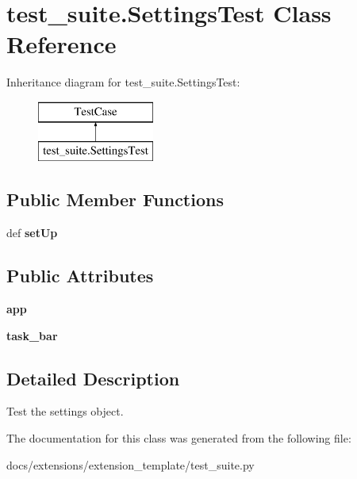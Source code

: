 \hypertarget{classtest__suite_1_1SettingsTest}{\section{test\-\_\-suite.\-Settings\-Test Class Reference}
\label{classtest__suite_1_1SettingsTest}
}
Inheritance diagram for test\-\_\-suite.\-Settings\-Test\-:\begin{figure}[H]
\begin{center}
\leavevmode
\includegraphics[height=2.000000cm]{classtest__suite_1_1SettingsTest}
\end{center}
\end{figure}
\subsection*{Public Member Functions}
\begin{DoxyCompactItemize}
\item 
\hypertarget{classtest__suite_1_1SettingsTest_aeaf8c43fc51455f8d8ab9d08dfc83fc2}{def {\bfseries set\-Up}}\label{classtest__suite_1_1SettingsTest_aeaf8c43fc51455f8d8ab9d08dfc83fc2}

\end{DoxyCompactItemize}
\subsection*{Public Attributes}
\begin{DoxyCompactItemize}
\item 
\hypertarget{classtest__suite_1_1SettingsTest_aa5ba18125ff41b7c4e906a92da7e47a0}{{\bfseries app}}\label{classtest__suite_1_1SettingsTest_aa5ba18125ff41b7c4e906a92da7e47a0}

\item 
\hypertarget{classtest__suite_1_1SettingsTest_acb4e8a196242a0a395d7777529de431c}{{\bfseries task\-\_\-bar}}\label{classtest__suite_1_1SettingsTest_acb4e8a196242a0a395d7777529de431c}

\end{DoxyCompactItemize}


\subsection{Detailed Description}
\begin{DoxyVerb}Test the settings object.
\end{DoxyVerb}
 

The documentation for this class was generated from the following file\-:\begin{DoxyCompactItemize}
\item 
docs/extensions/extension\-\_\-template/test\-\_\-suite.\-py\end{DoxyCompactItemize}
